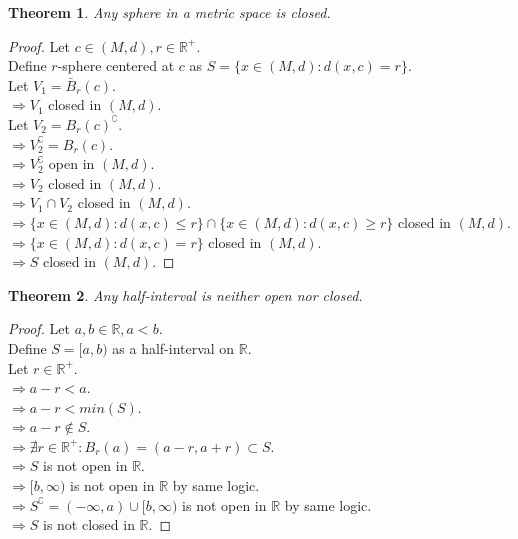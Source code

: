 \documentclass{article}
\newtheorem{theorem}{Theorem}[section]
\begin{document}
			\begin{theorem}
				Any sphere in a metric space is closed.
			\end{theorem}
			\begin{proof} 
				Let $c \in (M, d), r \in \mathbb{R}^+$. \\
				Define $r$-sphere centered at $c$ as $S = \{x \in (M, d): d(x, c) = r \}$. \\
				Let $V_1 = \bar{B}_{r}(c)$. \\
				$\Rightarrow V_1$ closed in $(M, d)$. \\
				Let $V_2 = B_{r}(c)^\complement$. \\
				$\Rightarrow V_2^\complement = B_{r}(c)$. \\
				$\Rightarrow V_2^\complement$ open in $(M, d)$. \\
				$\Rightarrow V_2$ closed in $(M, d)$. \\
				$\Rightarrow V_1 \cap V_2$ closed in $(M, d)$. \\
				$\Rightarrow \{x \in (M, d): d(x, c) \leq r \} \cap \{x \in (M, d): d(x, c) \geq r \}$ closed in $(M, d)$. \\
				$\Rightarrow \{x \in (M, d): d(x, c) = r \}$ closed in $(M, d)$. \\
				$\Rightarrow S$ closed in $(M, d)$.
			\end{proof}
			\begin{theorem}
				Any half-interval is neither open nor closed.
			\end{theorem}
			\begin{proof} 
				Let $a, b \in \mathbb{R}, a < b$. \\
				Define $S = [a, b)$ as a half-interval on $\mathbb{R}$. \\
				Let $r \in \mathbb{R}^+$. \\
				$\Rightarrow a - r < a$. \\
				$\Rightarrow a - r < min(S)$. \\
				$\Rightarrow a - r \notin S$. \\
				$\Rightarrow \nexists r \in \mathbb{R}^{+}: B_{r}(a) = (a - r, a + r) \subset S$. \\
				$\Rightarrow S$ is not open in $\mathbb{R}$. \\
				$\Rightarrow [b, \infty)$ is not open in $\mathbb{R}$ by same logic.\\
				$\Rightarrow S^\complement = (-\infty, a) \cup [b, \infty)$ is not open in $\mathbb{R}$ by same logic.\\
				$\Rightarrow S$ is not closed in $\mathbb{R}$.
			\end{proof}
\end{document}
